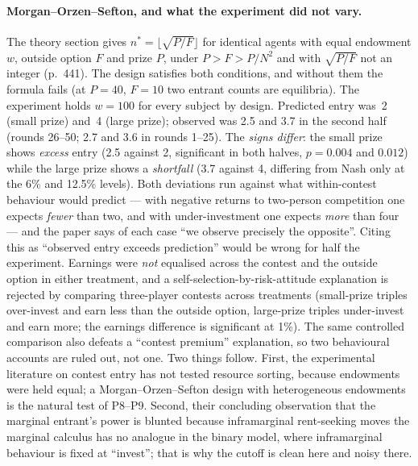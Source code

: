 \documentclass[11pt,a4paper]{article}
\begin{document}
\paragraph{Morgan--Orzen--Sefton, and what the experiment did not vary.} The
theory section gives $n^* = \lfloor \sqrt{P/F} \rfloor$ for identical agents
with equal endowment $w$, outside option $F$ and prize $P$, under
$P > F > P/N^2$ and with $\sqrt{P/F}$ not an integer (p.~441). The design
satisfies both conditions, and without them the formula fails (at $P = 40$,
$F = 10$ two entrant counts are equilibria). The experiment holds
$w = 100$ for every subject by design. Predicted entry was~2 (small prize)
and~4 (large prize); observed was 2.5 and 3.7 in the second half (rounds
26--50; 2.7 and 3.6 in rounds 1--25). The \emph{signs differ}: the small prize
shows \emph{excess} entry (2.5 against 2, significant in both halves,
$p = 0.004$ and $0.012$) while the large prize shows a \emph{shortfall} (3.7
against 4, differing from Nash only at the 6\% and 12.5\% levels). Both
deviations run against what within-contest behaviour would predict --- with
negative returns to two-person competition one expects \emph{fewer} than two,
and with under-investment one expects \emph{more} than four --- and the paper
says of each case ``we observe precisely the opposite''. Citing this as
``observed entry exceeds prediction'' would be wrong for half the experiment.
Earnings were \emph{not}
equalised across the contest and the outside option in either treatment, and a
self-selection-by-risk-attitude explanation is rejected by comparing
three-player contests across treatments (small-prize triples over-invest and
earn less than the outside option, large-prize triples under-invest and earn
more; the earnings difference is significant at 1\%). The same controlled
comparison also defeats a ``contest premium'' explanation, so two behavioural
accounts are ruled out, not one. Two things follow. First, the experimental
literature on contest entry has not tested resource sorting, because endowments
were held equal; a Morgan--Orzen--Sefton design with heterogeneous endowments
is the natural test of P8--P9. Second, their concluding observation that the
marginal entrant's power is blunted because inframarginal rent-seeking moves
the marginal calculus has no analogue in the binary model, where inframarginal
behaviour is fixed at ``invest''; that is why the cutoff is clean here and
noisy there.
\end{document}
